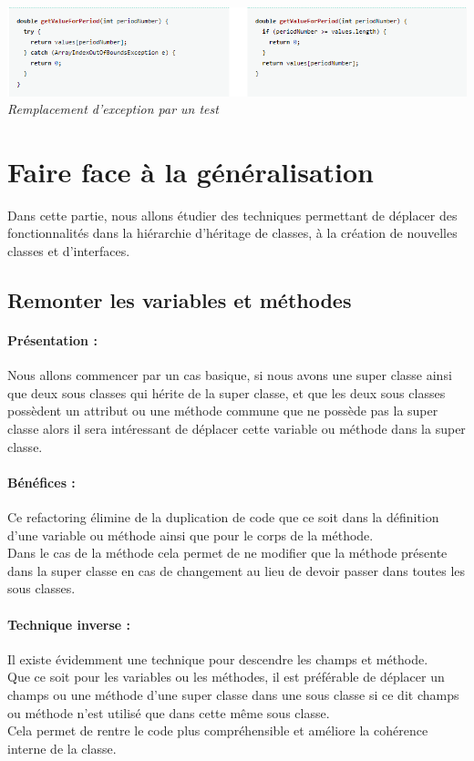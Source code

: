 \documentclass[a4paper,twoside,12pt,openright]{report}
\begin{document}
\begin{center}
\includegraphics[scale=0.75]{Image/ExceptionTest.png}\\
\itshape{Remplacement d'exception par un test \cite{ref5}}
\end{center}

\newpage
\section{Faire face à la généralisation}
Dans cette partie, nous allons étudier des techniques permettant de déplacer des fonctionnalités dans la hiérarchie d'héritage de classes, à la création de nouvelles classes et d'interfaces.\\



\subsection{Remonter les variables et méthodes}
\paragraph{Présentation :}
Nous allons commencer par un cas basique, si nous avons une super classe ainsi que deux sous classes qui hérite de la super classe, et que les deux sous classes possèdent un attribut ou une méthode commune que ne possède pas la super classe alors il sera intéressant de déplacer cette variable ou méthode dans la super classe.\\

\paragraph{Bénéfices :}
Ce refactoring élimine de la duplication de code que ce soit dans la définition d'une variable ou méthode ainsi que pour le corps de la méthode.\\
Dans le cas de la méthode cela permet de ne modifier que la méthode présente dans la super classe en cas de changement au lieu de devoir passer dans toutes les sous classes.\\

\paragraph{Technique inverse :}
Il existe évidemment une technique pour descendre les champs et méthode.\\
Que ce soit pour les variables ou les méthodes, il est préférable de déplacer un champs ou une méthode d'une super classe dans une sous classe si ce dit champs ou méthode n'est utilisé que dans cette même sous classe.\\
Cela permet de rentre le code plus compréhensible et améliore la cohérence interne de la classe.\\
\end{document}
